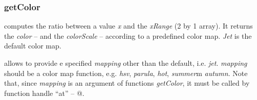 \subsubsection{getColor}
\bdf
{} computes the ratio between a value \emph{x} and the \emph{xRange} (2 by 1 array). It returns the \emph{color} --  and the \emph{colorScale}  -- according to a predefined color map. \emph{Jet} is the default color map. 

 allows to provide e specified \emph{mapping} other than the default, i.e. \emph{jet}. \emph{mapping} should be a color map function, e.g. \emph{hsv}, \emph{parula}, \emph{hot}, \emph{summer}m \emph{autumn}. Note that, since \emph{mapping} is an argument of functions \emph{getColor}, it must be called by function handle ``at'' -- @.
\edf
